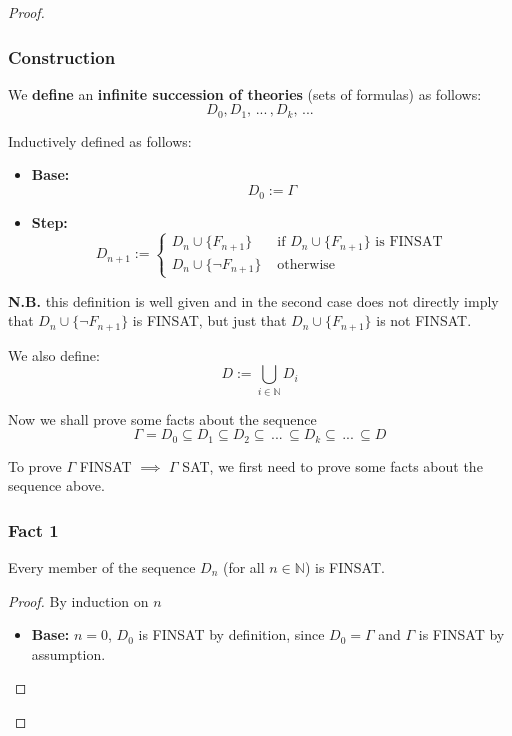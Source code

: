 \begin{proof}
		\newpage

		\subsubsection{Construction}

		We \textbf{define} an \textbf{infinite succession of theories} (sets of formulas) as follows:
		$$ D_0, D_1, \, ... \, , D_k , \, ... $$

		\noindent
		Inductively defined as follows:
		\begin{itemize}
			\item \textbf{Base:}
			$$D_0 := \Gamma$$

			\item \textbf{Step:}
			$$ D_{n+1} := \begin{cases}
				D_n \cup \{F_{n+1}\} \; & \text{ if } D_n \cup \{F_{n+1}\} \text{ is FINSAT} \\
				D_n \cup \{\neg F_{n+1}\}  & \text{ otherwise }
			\end{cases}
			$$
		\end{itemize}
		\textbf{N.B.} this definition is well given and in the second case does not directly imply that $D_n \cup \{\neg F_{n+1}\}$ is FINSAT, but just that $D_n \cup \{F_{n+1}\}$ is not FINSAT.

		 We also define:
		$$ D := \bigcup_{i \in \mathbb{N}} D_i$$

		Now we shall prove some facts about the sequence
		$$ \Gamma = D_0 \subseteq D_1 \subseteq D_2 \subseteq \, ... \, \subseteq D_k \subseteq \, ... \, \subseteq D $$

		To prove $\Gamma$ FINSAT $\implies$ $\Gamma$ SAT, we first need to prove some facts about the sequence above.

		\subsubsection{Fact 1} \label{fact:fact1}

		\begin{center}
		Every member of the sequence $D_n$ (for all $n \in \mathbb{N}$) is FINSAT.
		\end{center}

		\begin{proof}
			By induction on $n$
			\begin{itemize}
				\item \textbf{Base:} $n=0$, $D_0$ is FINSAT by definition, since $D_0 = \Gamma$ and $\Gamma$ is FINSAT by assumption.


\end{itemize}
\end{proof}
\end{proof}
